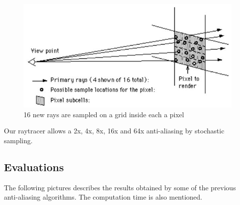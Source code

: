 \begin{figure}[H]
\centering
\includegraphics[width=0.5\linewidth]{img/antialiasing/stochastic.jpg}
\caption{16 new rays are sampled on a grid inside each a pixel}
\label{fig:aa_stochastic}
\end{figure}

Our raytracer allows a 2x, 4x, 8x, 16x and 64x anti-aliasing by stochastic sampling.


\subsection{Evaluations}
The following pictures describes the results obtained by some of the previous anti-aliasing algorithms. The computation time is also mentioned.

